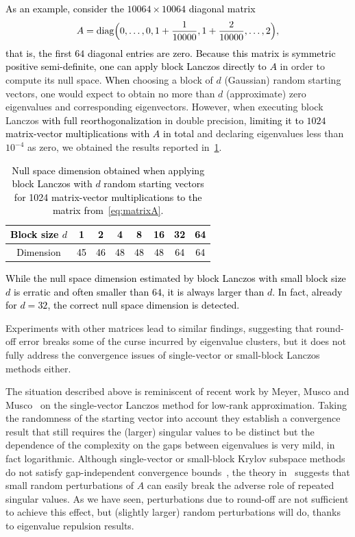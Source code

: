 \documentclass{siamart190516}
\providecommand{\diagm}{\mathrm{diag}}
\newcommand{\editr}[1]{\textcolor{black}{#1}} %
\newcommand{\redit}[1]{\textcolor{black}{#1}} %
\begin{document}
\editr{
As an example, consider the $10064\times 10064$ diagonal matrix 
\begin{equation} \label{eq:matrixA}
    A = \diagm \Bigl(0,\dotsc,0,1+\frac{1}{10000},1+\frac{2}{10000},\dotsc,2\Bigr),
\end{equation}
that is, the first $64$ diagonal entries are zero.} \redit{Because this matrix is symmetric positive semi-definite, one can apply block Lanczos directly to $A$} in order to compute its null space. \redit{When} choosing a block of $d$ (Gaussian) random starting vectors, one would expect to obtain no more than $d$ (approximate) zero eigenvalues and corresponding eigenvectors. However, when executing block Lanczos \editr{with full reorthogonalization} in double precision, \editr{limiting it to $1024$ matrix-vector multiplications with $A$ in total} and declaring eigenvalues less than $10^{-4}$ as zero, we obtained the results reported in~\cref{tabintro}. \editr{
\begin{table}[htbp]
    \centering
    \caption{Null space dimension obtained when applying block Lanczos with $d$ random starting vectors \editr{for 1024 matrix-vector multiplications} to the matrix from~\cref{eq:matrixA}.}
    \label{tabintro}
    \editr{
    \begin{tabular}{|c|c|c|c|c|c|c|c|}
        \hline
        Block size $d$ & 1 & 2 & 4 & 8 & 16 & 32 & 64  \\ \hline 
        Dimension &   45 & 46 & 48 & 48 & 48 & 64 & 64\\ \hline 
    \end{tabular}}
\end{table}
While the null space dimension estimated by block Lanczos with small block size $d$ is erratic and often smaller than $64$, it is always larger than $d$. In fact, already for $d = 32$, the correct null space dimension is detected.} Experiments with other matrices lead to similar findings, suggesting that round-off error breaks some of the curse incurred by eigenvalue clusters, but it does not fully address the convergence issues of single-vector or small-block Lanczos methods either.

The situation described above is reminiscent of recent work by Meyer, Musco and Musco~\cite{Meyer2023} on the single-vector Lanczos method for low-rank approximation. Taking the randomness of the starting vector into account they establish a convergence result that still requires the (larger) singular values to be distinct but the dependence of the complexity on the gaps between eigenvalues is very mild, in fact logarithmic. Although single-vector or small-block Krylov subspace methods do not satisfy gap-independent convergence bounds~\cite{Li2015,Saad1980,Musco2015,Yuan2018}, the theory in~\cite{Meyer2023} suggests that small random perturbations of $A$ can easily break the adverse role of repeated singular values. As we have seen, perturbations due to round-off are not sufficient to achieve this effect, but (slightly larger) random perturbations will do, thanks to eigenvalue repulsion results.
\end{document}
